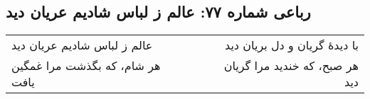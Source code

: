 \begin{center}
\section*{رباعی شماره ۷۷: عالم ز لباس شادیم عریان دید}
\label{sec:077}
\begin{longtable}{l p{0.5cm} r}
عالم ز لباس شادیم عریان دید
&&
با دیدهٔ گریان و دل بریان دید
\\
هر شام، که بگذشت مرا غمگین یافت
&&
هر صبح، که خندید مرا گریان دید
\\
\end{longtable}
\end{center}
